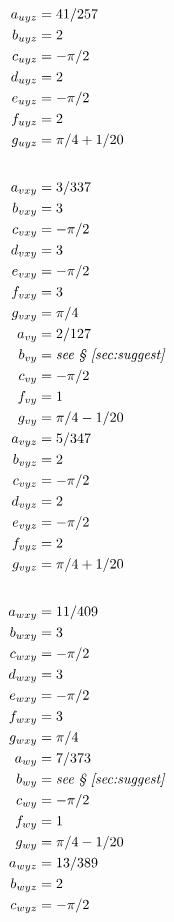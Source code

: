 \documentclass[10pt,reqno]{amsart}
\begin{document}
\begin{table}[p]
\begin{multicols}{3}
\begin{small}
\begin{align*}
a_{uyz} &= 41 / 257 \\
b_{uyz} &= 2 \\
c_{uyz} &= - \pi / 2 \\
d_{uyz} &= 2 \\
e_{uyz} &= - \pi / 2 \\
f_{uyz} &= 2 \\
g_{uyz} &= \pi / 4 + 1 / 20 \\
\intertext{}
a_{vxy} &= 3 / 337 \\
b_{vxy} &= 3 \\
c_{vxy} & = - \pi / 2 \\
d_{vxy} & = 3         \\
e_{vxy} & = - \pi / 2 \\
f_{vxy} &= 3 \\
g_{vxy} &= \pi / 4 \\
a_{vy} &= 2 / 127 \\
b_{vy} &= \text{\emph{see \textsection{}~\ref{sec:suggest}}} \\
c_{vy} &= - \pi / 2 \\
f_{vy} &= 1 \\
g_{vy} &= \pi / 4 - 1 / 20 \\
a_{vyz} &= 5 / 347 \\
b_{vyz} &= 2 \\
c_{vyz} &= -\pi / 2 \\
d_{vyz} &= 2 \\
e_{vyz} &= -\pi / 2 \\
f_{vyz} &= 2 \\
g_{vyz} &= \pi / 4 + 1 / 20 \\
\intertext{}
a_{wxy} &= 11 / 409 \\
b_{wxy} &= 3 \\
c_{wxy} &= -\pi / 2 \\
d_{wxy} &= 3 \\
e_{wxy} &= -\pi / 2 \\
f_{wxy} &= 3 \\
g_{wxy} &= \pi / 4 \\
a_{wy} &= 7 / 373 \\
b_{wy} &= \text{\emph{see \textsection{}~\ref{sec:suggest}}} \\
c_{wy} &= - \pi / 2 \\
f_{wy} &= 1 \\
g_{wy} &= \pi / 4 - 1 / 20 \\
a_{wyz} &= 13 / 389 \\
b_{wyz} &= 2 \\
c_{wyz} &= - \pi / 2 \\

\end{align*}
\end{small}
\end{multicols}
\end{table}
\end{document}
